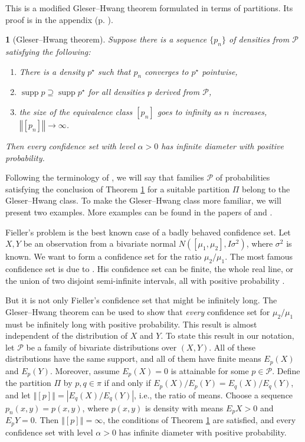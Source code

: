 \documentclass[article]{ajs}
\numberwithin{equation}{section}
\numberwithin{figure}{section}
\theoremstyle{plain}
\newtheorem{thm}{\protect\theoremname}
\theoremstyle{definition}
\theoremstyle{definition}
\theoremstyle{plain}
\providecommand{\theoremname}{Theorem}
\DeclareMathOperator{\supp}{supp}
\begin{document}
This is a modified Gleser--Hwang theorem \citep[Theorem 1]{gleser1987nonexistence}
formulated in terms of partitions. Its proof is in the appendix (p.
\pageref{proof:Gleser--Hwang}).
\begin{thm}[Gleser--Hwang theorem]
\label{thm:Gleser--Hwang} Suppose there is a sequence $\{p_{n}\}$
of densities from $\mathcal{P}$ satisfying the following: 
\begin{enumerate}
\item There is a density $p^{\star}$ such that $p_{n}$ converges to $p^{\star}$
pointwise,
\item $\supp p\supseteq\supp p^{\star}$ for all densities $p$ derived
from $\mathcal{P}$,
\item the size of the equivalence class $[p_{n}]$ goes to infinity as $n$
increases, $\left\Vert [p_{n}]\right\Vert \to\infty$.
\end{enumerate}
Then every confidence set with level $\alpha>0$ has infinite diameter
with positive probability.
\end{thm}

Following the terminology of \citet{berger1999integrated}, we will
say that families $\mathcal{P}$ of probabilities satisfying the conclusion
of Theorem \ref{thm:Gleser--Hwang} for a suitable partition $\Pi$
belong to the Gleser--Hwang class. To make the Gleser--Hwang class
more familiar, we will present two examples. More examples can be
found in the papers of \citet{gleser1987nonexistence} and \citet{berger1999integrated}.

Fieller's problem is the best known case of a badly behaved confidence
set. Let $X,Y$ be an observation from a bivariate normal $N([\mu_{1},\mu_{2}],I\sigma^{2})$,
where $\sigma^{2}$ is known. We want to form a confidence set for
the ratio $\mu_{2}/\mu_{1}$. The most famous confidence set is due
to \citet{Fieller1940-lg}. His confidence set can be finite, the
whole real line, or the union of two disjoint semi-infinite intervals, all with positive probability \citep{Koschat1987-dk}.

But it is not only Fieller's confidence set that might be infinitely
long. The Gleser--Hwang theorem can be used to show that \textit{every} confidence
set for $\mu_{2}/\mu_{1}$ must be infinitely long with positive probability.
This result is almost independent of the distribution of $X$ and
$Y$. To state this result in our notation, let $\mathcal{P}$ be
a family of bivariate distributions over $(X,Y)$. All of these distributions
have the same support, and all of them have finite means $E_{p}(X)$
and $E_{p}(Y)$. Moreover, assume $E_{p}(X)=0$ is attainable for
some $p\in\mathcal{P}$. Define the partition $\Pi$ by $p,q\in\pi$
if and only if $E_{p}(X)/E_{p}(Y)=E_{q}(X)/E_{q}(Y)$, and let $\left\Vert [p]\right\Vert =|E_{q}(X)/E_{q}(Y)|$,
i.e., the ratio of means. Choose a sequence $p_{n}(x,y)=p(x,y)$,
where $p(x,y)$ is density with means $E_{p}X>0$ and $E_{p}Y=0$.
Then $\left\Vert [p]\right\Vert =\infty$, the conditions of Theorem
\ref{thm:Gleser--Hwang} are satisfied, and every confidence set with
level $\alpha>0$ has infinite diameter with positive probability.
\end{document}
